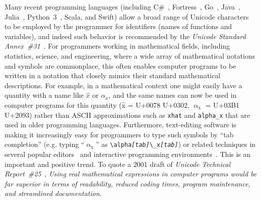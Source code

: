 \documentclass[10pt,english]{article}
\begin{document}
Many recent programming languages (including C\#~\cite{Csharp}, Fortress~\cite{Fortress},
Go~\cite{Go}, Java~\cite{Java}, Julia~\cite{Julia}, Python~3~\cite{Python}, Scala\cite{Scala}, and Swift\cite{Swift}) allow
a broad range of Unicode characters to be employed by the programmer
for identifiers (names of functions and variables), and indeed such
behavior is recommended by the \emph{Unicode Standard Annex~\#31}~\cite{UAX31}.
For programmers working in mathematical fields, including statistics,
science, and engineering, where a wide array of mathematical notations
and symbols are commonplace, this often enables computer programs
to be written in a notation that closely mimics their standard mathematical
descriptions. For example, in a mathematical context one might easily
have a quantity with a name like $\hat{x}$ or $\alpha_{x}$, and
the same names can now be used in computer programs for this quantity
($\mathrm{\hat{{x}}}$ = U+0078 U+0302, $\mathrm{{\upalpha_{x}}}$
= U+03B1 U+2093) rather than ASCII approximations such as \texttt{xhat}
and \texttt{alpha\_x} that are used in older programming languages.
Furthermore, text-editing software is making it increasingly easy
for programmers to type such symbols by ``tab completion''
(e.g. typing ``$\mathrm{{\upalpha_{x}}}$''
as \texttt{\textbackslash{}alpha}\texttt{\emph{{[}tab{]}}}\texttt{\textbackslash{}\_x}\texttt{\emph{{[}tab{]}}})
or related techniques in several popular editors~\cite{vsCode,Atom,Emacs,Sublime,Vim}
and interactive programming environments~\cite{Julia,IPython}. This
is an important and positive trend. To quote a 2001 draft of \emph{Unicode
Technical Report~\#25}~\cite[section 5.3]{UTR25}, \emph{Using real
mathematical expressions in computer programs would be far superior
in terms of readability, reduced coding times, program maintenance,
and streamlined documentation.}
\end{document}
